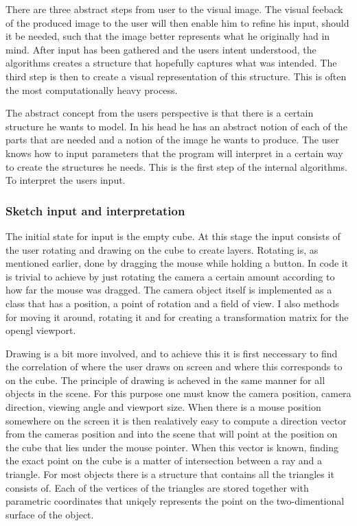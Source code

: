 \documentclass[a4paper,12pt]{article}
\begin{document}
There are three abstract steps from user to the visual image. The visual feeback of the produced image to the user will then enable him to refine his input, should it be needed, such that the image better represents what he originally had in mind. After input has been gathered and the users intent understood, the algorithms creates a structure that hopefully captures what was intended. The third step is then to create a visual representation of this structure. This is often the most computationally heavy process.

The abstract concept from the users perspective is that there is a certain structure he wants to model. In his head he has an abstract notion of each of the parts that are needed and a notion of the image he wants to produce. The user knows how to input parameters that the program will interpret in a certain way to create the structures he needs. This is the first step of the internal algorithms. To interpret the users input.

\subsubsection{Sketch input and interpretation}
The initial state for input is the empty cube. At this stage the input consists of the user rotating and drawing on the cube to create layers. Rotating is, as mentioned earlier, done by dragging the mouse while holding a button. In code it is trivial to achieve by just rotating the camera a certain amount according to how far the mouse was dragged. The camera object itself is implemented as a class that has a position, a point of rotation and a field of view. I also methods for moving it around, rotating it and for creating a transformation matrix for the opengl viewport.

Drawing is a bit more involved, and to achieve this it is first neccessary to find the correlation of where the user draws on screen and where this corresponds to on the cube. The principle of drawing is acheved in the same manner for all objects in the scene. For this purpose one must know the camera position, camera direction, viewing angle and viewport size. When there is a mouse position somewhere on the screen it is then realatively easy to compute a direction vector from the cameras position and into the scene that will point at the position on the cube that lies under the mouse pointer. When this vector is known, finding the exact point on the cube is a matter of intersection between a ray and a triangle. For most objects there is a structure that contains all the triangles it consists of. Each of the vertices of the triangles are stored together with parametric coordinates that uniqely represents the point on the two-dimentional surface of the object.
\end{document}
